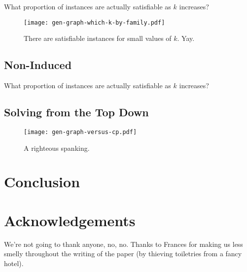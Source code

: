 \documentclass[letterpaper]{article}
\theoremstyle{definition}
\begin{document}
What proportion of instances are actually satisfiable as $k$ increases?

\begin{figure}
    \texttt{[image: gen-graph-which-k-by-family.pdf]}
    \caption{There are satisfiable instances for small values of $k$. Yay.}\label{figure:which-k}
\end{figure}

\subsection{Non-Induced}

What proportion of instances are actually satisfiable as $k$ increases?

\subsection{Solving from the Top Down}

\begin{figure}
    \texttt{[image: gen-graph-versus-cp.pdf]}
    \caption{A righteous spanking.}\label{figure:versus-cp}
\end{figure}

\section{Conclusion}

\section*{Acknowledgements}

We're not going to thank anyone, no, no.  Thanks to Frances for making us less smelly throughout the writing of the paper (by thieving toiletries from a fancy hotel).



\end{document}
